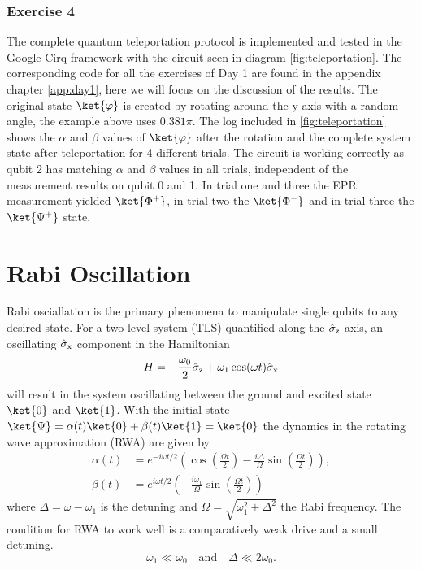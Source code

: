 \subsubsection{Exercise 4}
The complete quantum teleportation protocol is implemented and tested in the Google Cirq framework with the circuit seen in diagram \ref{fig:teleportation}. The corresponding code for all the exercises of Day 1 are found in the appendix chapter \ref{app:day1}, here we will focus on the discussion of the results. The original state $\ket{\varphi}$ is created by rotating around the y axis with a random angle, the example above uses $0.381\pi$. The log included in \ref{fig:teleportation} shows the $\alpha$ and $\beta$ values of $\ket{\varphi}$ after the rotation and the complete system state after teleportation for 4 different trials. The circuit is working correctly as qubit 2 has matching $\alpha$ and $\beta$ values in all trials, independent of the measurement results on qubit 0 and 1. In trial one and three the EPR measurement yielded $\ket{\Phi^+}$, in trial two the $\ket{\Phi^-}$ and in trial three the $\ket{\Psi^+}$ state.

\section{Rabi Oscillation}
Rabi osciallation is the primary phenomena to manipulate single qubits to any desired state. For a two-level system (TLS) quantified along the $\sigmaz$ axis, an oscillating $\sigmax$ component in the Hamiltonian
\begin{equation}
    H = -\frac{\omega_0}{2}\sigmaz + \omega_1\cos(\omega t)\sigmax
\end{equation}
will result in the system oscillating between the ground and excited state $\ket{0}$ and $\ket{1}$.  With the initial state $\ket{\Psi} = \alpha (t)\ket{0} + \beta (t)\ket{1} = \ket{0}$ the dynamics in the rotating wave approximation (RWA) are given by
\begin{equation}
\begin{aligned}
    \label{eq:dynamics}
    \alpha (t) &= e^{-i\omega t/2}\left(\cos \left(\frac{\Omega t}{2}\right) - \frac{i\Delta}{\Omega}\sin \left(\frac{\Omega t}{2}\right)\right), \\
    \beta (t) &= e^{i\omega t/2}\left(-\frac{i\omega_1}{\Omega}\sin \left(\frac{\Omega t}{2}\right)\right)
\end{aligned}
\end{equation}
where $\Delta = \omega - \omega_1$ is the detuning and $\Omega = \sqrt{\omega^2_1 + \Delta^2}$ the Rabi frequency. The condition for RWA to work well is a comparatively weak drive and a small detuning.
\begin{equation}
    \label{eq:conditions}
    \omega_1 \ll \omega_0 \quad \mathrm{and} \quad \Delta \ll 2\omega_0.
\end{equation}

